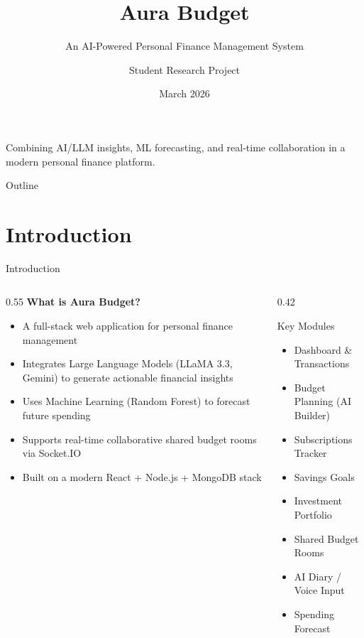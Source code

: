 \documentclass[aspectratio=169, 11pt]{beamer}
\title[Aura Budget]{\textbf{Aura Budget}}
\subtitle{An AI-Powered Personal Finance Management System}
\author{Student Research Project}
\institute{SRP Project}
\date{March 2026}
\newcommand{\bulletitem}[1]{\item[\textcolor{auraviolet}{\faCheckCircle}] #1}
\begin{document}
\begin{frame}
  \titlepage
  \begin{center}
    \small\textcolor{auradark}{Combining AI/LLM insights, ML forecasting, and real-time
    collaboration in a modern personal finance platform.}
  \end{center}
\end{frame}

\begin{frame}{Outline}
  \tableofcontents
\end{frame}

\section{Introduction}
\begin{frame}{Introduction}
  \begin{columns}[T]
    \begin{column}{0.55\textwidth}
      \textbf{What is Aura Budget?}
      \vspace{6pt}
      \begin{itemize}
        \bulletitem{A full-stack web application for personal finance management}
        \bulletitem{Integrates \alert{Large Language Models} (LLaMA 3.3, Gemini) to generate actionable financial insights}
        \bulletitem{Uses \alert{Machine Learning} (Random Forest) to forecast future spending}
        \bulletitem{Supports \alert{real-time collaborative} shared budget rooms via Socket.IO}
        \bulletitem{Built on a modern React + Node.js + MongoDB stack}
      \end{itemize}
    \end{column}
    \begin{column}{0.42\textwidth}
      \begin{block}{Key Modules}
        \begin{itemize}
          \item Dashboard \& Transactions
          \item Budget Planning (AI Builder)
          \item Subscriptions Tracker
          \item Savings Goals
          \item Investment Portfolio
          \item Shared Budget Rooms
          \item AI Diary / Voice Input
          \item Spending Forecast
        \end{itemize}
      \end{block}
    \end{column}
  \end{columns}
\end{frame}
\end{document}
